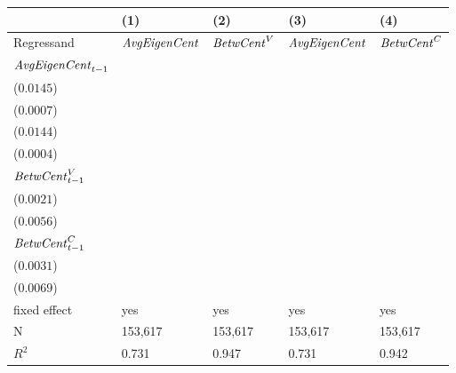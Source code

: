 \begin{tabular}{lllll}
\toprule
{} &                                      (1) &                                      (2) &                                      (3) &                                      (4) \\
\midrule
Regressand                 &                     ${\it AvgEigenCent}$ &                       ${\it BetwCent}^V$ &                     ${\it AvgEigenCent}$ &                       ${\it BetwCent}^C$ \\
${\it AvgEigenCent}_{t-1}$ &  \makecell{$0.8530^{***}$ \\ ($0.0145$)} &    \makecell{$-0.0001^{}$ \\ ($0.0007$)} &  \makecell{$0.8531^{***}$ \\ ($0.0144$)} &     \makecell{$0.0004^{}$ \\ ($0.0004$)} \\
${\it BetwCent}^V_{t-1}$   &  \makecell{$0.0097^{***}$ \\ ($0.0021$)} &  \makecell{$0.9721^{***}$ \\ ($0.0056$)} &                              \makecell{} &                              \makecell{} \\
${\it BetwCent}^C_{t-1}$   &                              \makecell{} &                              \makecell{} &  \makecell{$0.0122^{***}$ \\ ($0.0031$)} &  \makecell{$0.9668^{***}$ \\ ($0.0069$)} \\
\midrule fixed effect      &                                      yes &                                      yes &                                      yes &                                      yes \\
N                          &                                  153,617 &                                  153,617 &                                  153,617 &                                  153,617 \\
$R^2$                      &                                    0.731 &                                    0.947 &                                    0.731 &                                    0.942 \\
\bottomrule
\end{tabular}

